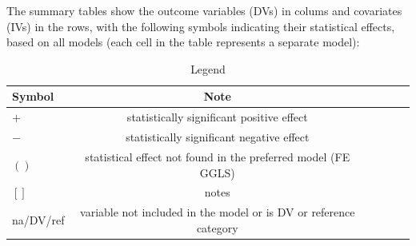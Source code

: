 \documentclass[12pt]{article}
\begin{document}
The summary tables show the outcome variables (DVs) in colums and covariates (IVs) in the rows, with the following symbols indicating their statistical effects, based on all models (each cell in the table represents a separate model):

\begin{table}[!htb]
\small
\centering
\caption{Legend}
\label{table_legend}
\begin{tabular}{lccccc}
\toprule
Symbol    & Note \\
\midrule
$+$       & statistically significant positive effect                         \\
$-$       & statistically significant negative effect                         \\
$()$      & statistical effect not found in the preferred model (FE GGLS)     \\
$[]$      & notes                                                             \\
na/DV/ref & variable not included in the model or is DV or reference category \\
\bottomrule
\end{tabular}
\end{table}
\end{document}
